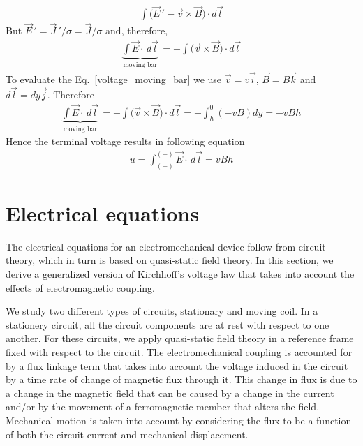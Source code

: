 \documentclass[12pt,a4paper,oneside]{book}
\begin{document}
\begin{onehalfspace}
\begin{example}
\begin{equation*}
\begin{aligned}
		\int\Big(\vec{E}\,'-\vec{v}\times\vec{B}\Big)\cdot d\vec{l}
	\end{aligned}
\end{equation*} 
But $\vec{E}\,'=\vec{J}\,'/\sigma = \vec{J}/\sigma$ and, therefore, 
\begin{equation}\label{voltage_moving_bar}
	\begin{aligned}
		\underbrace{\int\vec{E}\cdot\,d\vec{l}}_{\text{moving bar}} \, = 
		-\int\Big(\vec{v}\times\vec{B}\Big)\cdot d\vec{l}
	\end{aligned}
\end{equation} 
To evaluate the Eq.~\eqref{voltage_moving_bar} we use $\vec{v} = v\vec{i}$, $\vec{B} = B\vec{k}$ and $d\vec{l}=dy\vec{j}$.
Therefore 
\begin{equation*}\label{}
	\begin{aligned} 
		\underbrace{\int\vec{E}\cdot\,d\vec{l}}_{\text{moving bar}} \, = -\int\Big(\vec{v}\times\vec{B}\Big)\cdot d\vec{l} = -\int_{h}^{0}(-vB)dy=-vBh
	\end{aligned}
\end{equation*} 
Hence the terminal voltage results in following equation
\begin{equation}\label{}
	\begin{aligned}
		u = \int_{(-)}^{(+)}\vec{E}\cdot\,d\vec{l} = vBh
	\end{aligned}
\end{equation} 
\end{example}

\section{Electrical equations}
The electrical equations for an electromechanical device follow from circuit theory, which in turn is based on quasi-static field theory. In this section, we derive a generalized version of Kirchhoff's voltage law that takes into account the effects of electromagnetic coupling.

We study two different types of circuits, stationary and moving coil. In a stationery circuit, all the circuit components are at rest with respect to one another. For these circuits, we apply quasi-static field theory in a reference frame fixed with respect to the circuit. The electromechanical coupling is accounted for by a flux linkage term that takes into account the voltage induced in the circuit by a time rate of change of magnetic flux through it. This change in flux is due to a change in the magnetic field that can be caused by a change in the current and/or by the movement of a ferromagnetic member that alters the field. Mechanical motion is taken into account by considering the flux to be a function of both the circuit current and mechanical displacement.


\end{onehalfspace}
\end{document}

